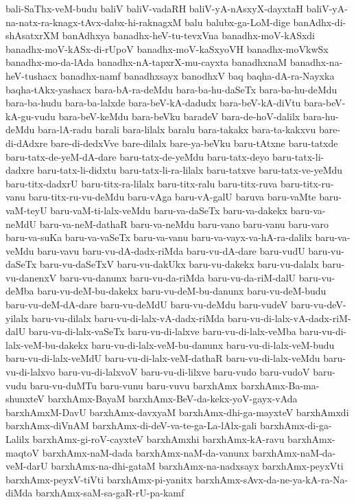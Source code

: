 {bali-SaThx-veM-budu
baliV
baliV-vadaRH
baliV-yA-nAsxyX-dayxtaH
baliV-yA-na-natx-ra-knagx-tAvx-dabx-hi-raknagxM
balu
balubx-ga-LoM-dige
banAdhx-di-shAsatxrXM
banAdhxya
banadhx-heV-tu-tevxVna
banadhx-moV-kASxdi
banadhx-moV-kASx-di-rUpoV
banadhx-moV-kaSxyoVH
banadhx-moVkwSx
banadhx-mo-da-lAda
banadhx-nA-tapxrX-mu-cayxta
banadhxnaM
banadhx-na-heV-tushacx
banadhx-namf
banadhxsayx
banodhxV
baq
baqha-dA-ra-Nayxka
baqha-tAkx-yashacx
bara-bA-ra-deMdu
bara-ba-hu-daSeTx
bara-ba-hu-deMdu
bara-ba-hudu
bara-ba-lalxde
bara-beV-kA-dadudx
bara-beV-kA-diVtu
bara-beV-kA-gu-vudu
bara-beV-keMdu
bara-beVku
baradeV
bara-de-hoV-dalilx
bara-hu-deMdu
bara-lA-radu
barali
bara-lilalx
baralu
bara-takakx
bara-ta-kakxvu
bare-di-dAdxre
bare-di-dedxVve
bare-dilalx
bare-ya-beVku
baru-tAtxne
baru-tatxde
baru-tatx-de-yeM-dA-dare
baru-tatx-de-yeMdu
baru-tatx-deyo
baru-tatx-li-dadxre
baru-tatx-li-didxtu
baru-tatx-li-ra-lilalx
baru-tatxve
baru-tatx-ve-yeMdu
baru-titx-dadxrU
baru-titx-ra-lilalx
baru-titx-ralu
baru-titx-ruva
baru-titx-ru-vanu
baru-titx-ru-vu-deMdu
baru-vAga
baru-vA-galU
baruva
baru-vaMte
baru-vaM-teyU
baru-vaM-ti-lalx-veMdu
baru-va-daSeTx
baru-va-dakekx
baru-va-neMdU
baru-va-neM-dathaR
baru-va-neMdu
baru-vano
baru-vanu
baru-varo
baru-va-suKa
baru-va-vaSeTx
baru-va-vanu
baru-va-vayx-va-hA-ra-dalilx
baru-va-veMdu
baru-vavu
baru-vu-dA-dadx-riMda
baru-vu-dA-dare
baru-vudU
baru-vu-daSeTx
baru-vu-daSeTxV
baru-vu-dakUkx
baru-vu-dakekx
baru-vu-dalalx
baru-vu-danenxV
baru-vu-danunx
baru-vu-da-riMda
baru-vu-da-riM-dalU
baru-vu-deMba
baru-vu-deM-bu-dakekx
baru-vu-deM-bu-danunx
baru-vu-deM-budu
baru-vu-deM-dA-dare
baru-vu-deMdU
baru-vu-deMdu
baru-vudeV
baru-vu-deV-yilalx
baru-vu-dilalx
baru-vu-di-lalx-vA-dadx-riMda
baru-vu-di-lalx-vA-dadx-riM-dalU
baru-vu-di-lalx-vaSeTx
baru-vu-di-lalxve
baru-vu-di-lalx-veMba
baru-vu-di-lalx-veM-bu-dakekx
baru-vu-di-lalx-veM-bu-danunx
baru-vu-di-lalx-veM-budu
baru-vu-di-lalx-veMdU
baru-vu-di-lalx-veM-dathaR
baru-vu-di-lalx-veMdu
baru-vu-di-lalxvo
baru-vu-di-lalxvoV
baru-vu-di-lilxve
baru-vudo
baru-vudoV
baru-vudu
baru-vu-duMTu
baru-vunu
baru-vuvu
barxhAmx
barxhAmx-Ba-ma-shunxteV
barxhAmx-BayaM
barxhAmx-BeV-da-kekx-yoV-gayx-vAda
barxhAmxM-DavU
barxhAmx-davxyaM
barxhAmx-dhi-ga-mayxteV
barxhAmxdi
barxhAmx-diVnAM
barxhAmx-di-deV-va-te-ga-La-lAlx-gali
barxhAmx-di-ga-Lalilx
barxhAmx-gi-roV-cayxteV
barxhAmxhi
barxhAmx-kA-ravu
barxhAmx-maqtoV
barxhAmx-naM-dada
barxhAmx-naM-da-vanunx
barxhAmx-naM-da-veM-darU
barxhAmx-na-dhi-gataM
barxhAmx-na-nadxsayx
barxhAmx-peyxVti
barxhAmx-peyxV-tiVti
barxhAmx-pi-yanitx
barxhAmx-sAvx-da-ne-ya-kA-ra-Na-diMda
barxhAmx-saM-sa-gaR-rU-pa-kamf
}
